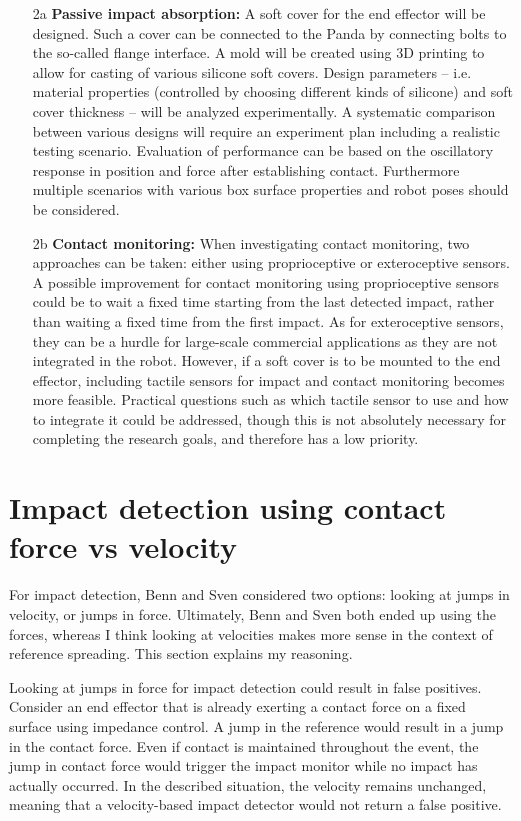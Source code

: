 \documentclass[11pt]{report}
\numberwithin{equation}{section}        %
\numberwithin{figure}{section}          %
\numberwithin{table}{section}           %
\begin{document}
\begin{enumerate}
   \item[2a] \textbf{Passive impact absorption:} A soft cover for the end effector will be designed. Such a cover can be connected to the Panda by connecting bolts to the so-called flange interface. A mold will be created using 3D printing to allow for casting of various silicone soft covers. Design parameters -- i.e. material properties (controlled by choosing different kinds of silicone) and soft cover thickness -- will be analyzed experimentally. A systematic comparison between various designs will require an experiment plan including a realistic testing scenario. Evaluation of performance can be based on the oscillatory response in position and force after establishing contact. Furthermore multiple scenarios with various box surface properties and robot poses should be considered.
  
  \item[2b] \textbf{Contact monitoring:} When investigating contact monitoring, two approaches can be taken: either using proprioceptive or exteroceptive sensors. A possible improvement for contact monitoring using proprioceptive sensors could be to wait a fixed time starting from the last detected impact, rather than waiting a fixed time from the first impact. As for exteroceptive sensors, they can be a hurdle for large-scale commercial applications as they are not integrated in the robot. However, if a soft cover is to be mounted to the end effector, including tactile sensors for impact and contact monitoring becomes more feasible. Practical questions such as which tactile sensor to use and how to integrate it could be addressed, though this is not absolutely necessary for completing the research goals, and therefore has a low priority.
  \end{enumerate}
  \newpage
  \section{Impact detection using contact force vs velocity}\label{sec:impact}
  For impact detection, Benn and Sven considered two options: looking at jumps in velocity, or jumps in force. Ultimately, Benn and Sven both ended up using the forces, whereas I think looking at velocities makes more sense in the context of reference spreading. This section explains my reasoning.

  Looking at jumps in force for impact detection could result in false positives. Consider an end effector that is already exerting a contact force on a fixed surface using impedance control. A jump in the reference would result in a jump in the contact force. Even if contact is maintained throughout the event, the jump in contact force would trigger the impact monitor while no impact has actually occurred. In the described situation, the velocity remains unchanged, meaning that a velocity-based impact detector would not return a false positive.
\end{document}
